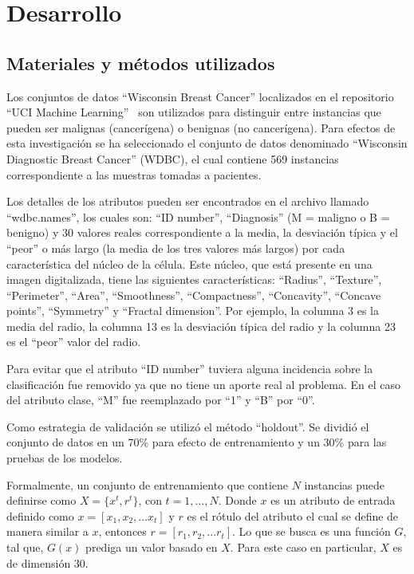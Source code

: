 \documentclass[conference]{IEEEtran}
\begin{document}
\section{Desarrollo}

\subsection{Materiales y métodos utilizados}
Los conjuntos de datos ``Wisconsin Breast Cancer'' localizados en el repositorio ``UCI Machine Learning''~\cite{resource:WDBC1995} son utilizados para distinguir entre instancias que pueden ser malignas (cancerígena) o benignas (no cancerígena). Para efectos de esta investigación se ha seleccionado el conjunto de datos denominado ``Wisconsin Diagnostic Breast Cancer'' (WDBC), el cual contiene 569 instancias correspondiente a las muestras tomadas a pacientes. \newline

Los detalles de los atributos pueden ser encontrados en el archivo llamado ``wdbc.names'', los cuales son: ``ID number'', ``Diagnosis'' (M = maligno o B = benigno) y 30 valores reales correspondiente a la media, la desviación típica y el ``peor'' o más largo (la media de los tres valores más largos) por cada característica del núcleo de la célula. Este núcleo, que está presente en una imagen digitalizada, tiene las siguientes características: ``Radius'', ``Texture'', ``Perimeter'', ``Area'', ``Smoothness'', ``Compactness'', ``Concavity'', ``Concave points'', ``Symmetry'' y ``Fractal dimension''. Por ejemplo, la columna 3 es la media del radio, la columna 13 es la desviación típica del radio y la columna 23 es el ``peor'' valor del radio. \newline

Para evitar que el atributo ``ID number'' tuviera alguna incidencia sobre la clasificación fue removido ya que no tiene un aporte real al problema. En el caso del atributo clase, ``M'' fue reemplazado por ``1'' y ``B'' por ``0''. \newline

Como estrategia de validación se utilizó el método ``holdout''. Se dividió el conjunto de datos en un 70\% para efecto de entrenamiento y un 30\% para las pruebas de los modelos. \newline

Formalmente, un conjunto de entrenamiento que contiene $N$ instancias puede definirse como $X= \{x^{t},r^{t}\}$, con $t=1,...,N$. Donde $x$ es un atributo de entrada definido como $x=[x_{1},x_{2},...x_{t}]$ y $r$ es el rótulo del atributo el cual se define de manera similar a $x$, entonces $r=[r_{1},r_{2},...r_{t}]$. Lo que se busca es una función $G$, tal que, $G(x)$ prediga un valor basado en $X$. Para este caso en particular, $X$ es de dimensión 30. \newline
\end{document}
